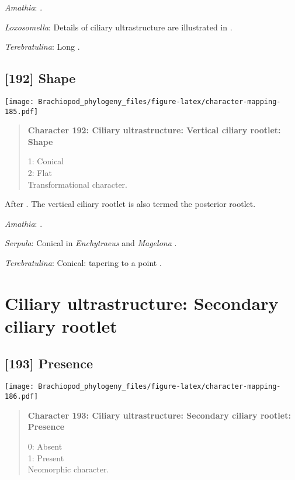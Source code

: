 \documentclass[openany]{book}
\theoremstyle{definition}
\theoremstyle{definition}
\theoremstyle{definition}
\theoremstyle{remark}
\begin{document}
\hypertarget{Amathia-coding-191}{}
\emph{Amathia}: \citet{Reed1982}.

\hypertarget{Loxosomella-coding-191}{}
\emph{Loxosomella}: Details of ciliary ultrastructure are illustrated in
\citet{Nielsen1976}.

\hypertarget{Terebratulina-coding-191}{}
\emph{Terebratulina}: Long \citep{Luter1995}.

\subsection*{{[}192{]} Shape}\label{shape}

\texttt{[image: Brachiopod\_phylogeny\_files/figure-latex/character-mapping-185.pdf]}

\begin{quote}
\textbf{Character 192: Ciliary ultrastructure: Vertical ciliary rootlet:
Shape}

1: Conical\\
2: Flat\\
Transformational character.
\end{quote}

After \citet{Lundin2009}. The vertical ciliary rootlet is also termed
the posterior rootlet.

\hypertarget{Amathia-coding-192}{}
\emph{Amathia}: \citet{Reed1982}.

\hypertarget{Serpula-coding-192}{}
\emph{Serpula}: Conical in \emph{Enchytraeus} \citep{Reger1967} and
\emph{Magelona} \citep{Bartolomaeus1995}.

\hypertarget{Terebratulina-coding-192}{}
\emph{Terebratulina}: Conical: tapering to a point \citep{Luter1995}.

\section{Ciliary ultrastructure: Secondary ciliary
rootlet}\label{ciliary-ultrastructure-secondary-ciliary-rootlet}

\subsection*{{[}193{]} Presence}\label{presence-4}

\texttt{[image: Brachiopod\_phylogeny\_files/figure-latex/character-mapping-186.pdf]}

\begin{quote}
\textbf{Character 193: Ciliary ultrastructure: Secondary ciliary
rootlet: Presence}

0: Absent\\
1: Present\\
Neomorphic character.
\end{quote}
\end{document}
